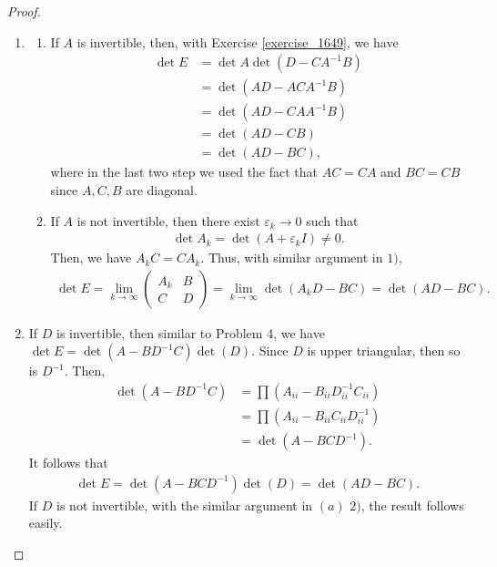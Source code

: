 \documentclass[11pt]{book}
\theoremstyle{definition}
\numberwithin{equation}{chapter}
\begin{document}
\begin{proof}
~\begin{enumerate}[label=(\alph*)]
    \item
    \begin{enumerate}[label=\arabic*)]
        \item If $A$ is invertible, then, with Exercise \ref{exercise_1649}, we have 
        \begin{align*}
            \det E & = \det A \det \left( D - C A^{-1} B\right) \\
            & = \det \left(AD - A C A^{-1} B\right) \\
            & = \det \left(AD - C A A^{-1} B\right) \\
            & = \det \left(AD - CB\right)\\
            & = \det \left(AD - BC\right),
        \end{align*}
        where in the last two step we used the fact that $AC = CA$ and $BC = CB$ since $A,C,B$ are diagonal.
        \item If $A$ is not invertible, then there exist $\varepsilon_k \to 0$ such that 
        \begin{align*}
            \det A_k = \det (A + \varepsilon_k I) \neq 0.
        \end{align*}
        Then, we have $A_k C = CA_k$. Thus, with similar argument in $1)$, 
        \begin{align*}
            \det E = \lim_{k\to \infty} \begin{pmatrix}
            A_k & B \\
            C & D
        \end{pmatrix} = \lim_{k\to\infty} \det \left(A_k D - BC\right) = \det \left(AD - BC\right).
        \end{align*}
    \end{enumerate}
    
    \item If $D$ is invertible, then similar to Problem 4, we have $\det E = \det (A-BD^{-1}C)\det(D)$. Since $D$ is upper triangular, then so is $D^{-1}$. Then, 
    \begin{align*}
        \det (A-BD^{-1}C) & = \prod \left(A_{ii} - B_{ii} D^{-1}_{ii} C_{ii}\right) \\
        & = \prod \left(A_{ii} - B_{ii} C_{ii} D^{-1}_{ii} \right) \\
        & = \det (A-BCD^{-1}).
    \end{align*}
    It follows that
    \begin{align*}
        \det E = \det (A-BCD^{-1})\det(D) = \det (AD - BC).
    \end{align*}
    If $D$ is not invertible, with the similar argument in $(a)\,\,2)$, the result follows easily.
    

\end{enumerate}
\end{proof}
\end{document}
